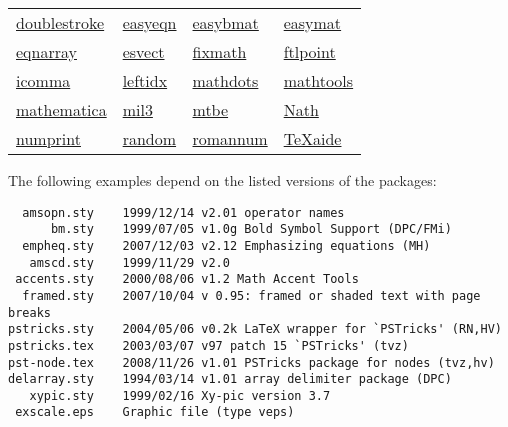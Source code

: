 \begin{table}[htb]
\begin{center}
\begin{tabular}{llll}
\href{http://www.dante.de/CTAN//help/Catalogue/entries/doublestroke.html}{doublestroke}&
\href{http://www.dante.de/CTAN//help/Catalogue/entries/easyeqn.html}{easyeqn}&
\href{http://www.dante.de/CTAN//help/Catalogue/entries/easybmat.html}{easybmat}&
\href{http://www.dante.de/CTAN//help/Catalogue/entries/easymat.html}{easymat}\\
\href{http://www.dante.de/CTAN//help/Catalogue/entries/eqnarray.html}{eqnarray}&
\href{http://www.dante.de/CTAN//help/Catalogue/entries/esvect.html}{esvect}&
\href{http://www.dante.de/CTAN//help/Catalogue/entries/fixmath.html}{fixmath}&
\href{http://www.dante.de/CTAN//help/Catalogue/entries/fltpoint.html}{ftlpoint}\\
\href{http://www.dante.de/CTAN//help/Catalogue/entries/icomma.html}{icomma}&
\href{http://www.dante.de/CTAN//help/Catalogue/entries/leftidx.html}{leftidx}&
\href{http://www.dante.de/CTAN//help/Catalogue/entries/mathdots.html}{mathdots}&
\href{http://www.dante.de/CTAN//help/Catalogue/entries/mathtools.html}{mathtools}\\
\href{http://www.dante.de/CTAN//help/Catalogue/entries/mathematica.html}{mathematica}&
\href{http://www.dante.de/CTAN//help/Catalogue/entries/mil3.html}{mil3}&
\href{http://www.dante.de/CTAN//help/Catalogue/entries/mtbe.html}{mtbe}&
\href{http://www.dante.de/CTAN//help/Catalogue/entries/nath.html}{Nath}\\
\href{http://www.dante.de/CTAN//help/Catalogue/entries/numprint.html}{numprint}&
\href{http://www.dante.de/CTAN//help/Catalogue/entries/random.html}{random}&
\href{http://www.dante.de/CTAN//help/Catalogue/entries/romannum.html}{romannum}&
\href{http://www.dante.de/CTAN//help/Catalogue/entries/texaide.html}{TeXaide}
\end{tabular}
\end{center}

The following examples depend on the listed versions of the packages:    %

{\small
\begin{verbatim}
  amsopn.sty    1999/12/14 v2.01 operator names
      bm.sty    1999/07/05 v1.0g Bold Symbol Support (DPC/FMi)
  empheq.sty    2007/12/03 v2.12 Emphasizing equations (MH)
   amscd.sty    1999/11/29 v2.0
 accents.sty    2000/08/06 v1.2 Math Accent Tools
  framed.sty    2007/10/04 v 0.95: framed or shaded text with page breaks
pstricks.sty    2004/05/06 v0.2k LaTeX wrapper for `PSTricks' (RN,HV)
pstricks.tex    2003/03/07 v97 patch 15 `PSTricks' (tvz)
pst-node.tex    2008/11/26 v1.01 PSTricks package for nodes (tvz,hv)
delarray.sty    1994/03/14 v1.01 array delimiter package (DPC)
   xypic.sty    1999/02/16 Xy-pic version 3.7
 exscale.eps    Graphic file (type veps)
\end{verbatim}
}



\end{table}
